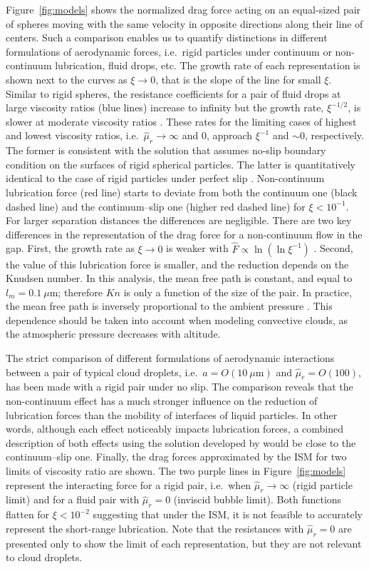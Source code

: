 \documentclass[../thesis.tex]{subfiles}
\begin{document}
Figure~\ref{fig:models} shows the normalized drag force acting on an equal-sized pair of spheres moving with the same velocity in opposite directions along their line of centers. Such a comparison enables us to quantify distinctions in different formulations of aerodynamic forces, i.e.\ rigid particles under continuum or non-continuum lubrication, fluid drops, etc. The growth rate of each representation is shown next to the curves as $\xi \to 0$, that is the slope of the line for small $\xi$. Similar to rigid spheres, the resistance coefficients for a pair of fluid drops at large viscosity ratios (blue lines) increase to infinity but the growth rate, $\xi^{-1/2}$, is slower at moderate viscosity ratios \citep{Z78,DSR89}. These rates for the limiting cases of highest and lowest viscosity ratios, i.e.\ $\hat{\mu}_r \to \infty$ and $0$, approach $\xi^{-1}$ and $\sim0$, respectively. The former is consistent with the solution that assumes no-slip boundary condition on the surfaces of rigid spherical particles. The latter is quantitatively identical to the case of rigid particles under perfect slip \cite[lower red dashed line:][]{RM74}. Non-continuum lubrication force (red line) starts to deviate from both the continuum one (black dashed line) and the continuum--slip one (higher red dashed line) for $\xi<10^{-1}$. For larger separation distances the differences are negligible. There are two key differences in the representation of the drag force for a non-continuum flow in the gap. First, the growth rate as $\xi \to 0$ is weaker with $\hat{F}\propto\ln(\ln \xi^{-1})$ \citep{SK96,DRK21a}. Second, the value of this lubrication force is smaller, and the reduction depends on the Knudsen number. In this analysis, the mean free path is constant, and equal to $l_m = 0.1~\mu \text{m}$; therefore $Kn$ is only a function of the size of the pair. In practice, the mean free path is inversely proportional to the ambient pressure \citep{J88}. This dependence should be taken into account when modeling convective clouds, as the atmospheric pressure decreases with altitude.

The strict comparison of different formulations of aerodynamic interactions between a pair of typical cloud droplets, i.e.\ $a=O(10~\mu \text{m})$ and $\hat{\mu}_r=O(100)$, has been made with a rigid pair under no slip. The comparison reveals that the non-continuum effect has a much stronger influence on the reduction of lubrication forces than the mobility of interfaces of liquid particles. In other words, although each effect noticeably impacts lubrication forces, a combined description of both effects using the solution developed by \cite{RSD22} would be close to the continuum--slip one. Finally, the drag forces approximated by the ISM for two limits of viscosity ratio are shown. The two purple lines in Figure~\ref{fig:models} represent the interacting force for a rigid pair, i.e.\ when $\hat{\mu}_r\to\infty$ (rigid particle limit) and for a fluid pair with $\hat{\mu}_r=0$ (inviscid bubble limit). Both functions flatten for $\xi<10^{-2}$ suggesting that under the ISM, it is not feasible to accurately represent the short-range lubrication. Note that the resistances with $\hat{\mu}_r=0$ are presented only to show the limit of each representation, but they are not relevant to cloud droplets.
\end{document}
